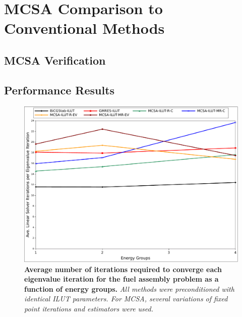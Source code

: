 \clearpage

\section{MCSA Comparison to Conventional Methods}
\label{sec:spn_comparison}

\subsection{MCSA Verification}
\label{subsec:spn_mcsa_verification}

\subsection{Performance Results}
\label{subsec:spn_comparison_results}

\begin{figure}[t!]
  \begin{center}
    \includegraphics[width=6in]{chapters/spn_equations/solver_iters.pdf}
  \end{center}
  \caption{\textbf{Average number of iterations required to converge
      each eigenvalue iteration for the fuel assembly problem as a
      function of energy groups.} \textit{All methods were
      preconditioned with identical ILUT parameters. For MCSA, several
      variations of fixed point iterations and estimators were used.}}
  \label{fig:comparison_iterations}
\end{figure}

